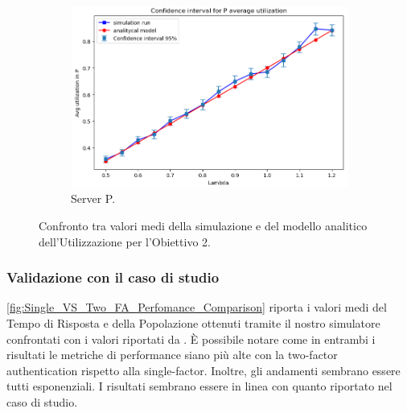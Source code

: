 \begin{figure}
\begin{subfigure}{0.5\linewidth}
        \includegraphics[width=1\linewidth]{figs//results//obj2//verification/obj2_lineplots_utilization_P.png}
        \caption{Server P.}
        \label{fig:obj2_lineplots_utilization_P}
    \end{subfigure}
    \caption{Confronto tra valori medi della simulazione e del modello analitico dell'Utilizzazione per l'Obiettivo 2.}
    \label{fig:obj2_lineplots_utilization}
\end{figure}

% 


\subsubsection{Validazione con il caso di studio}
\label{sec:results_obj2_validation}
\autoref{fig:Single_VS_Two_FA_Perfomance_Comparison} riporta i valori medi del Tempo di Risposta e della Popolazione ottenuti tramite il nostro simulatore confrontati con i valori riportati da \citet{DBLP:books/sp/Serazzi24}. È possibile notare come in entrambi i risultati le metriche di performance siano più alte con la two-factor authentication rispetto alla single-factor. Inoltre, gli andamenti sembrano essere tutti esponenziali. I risultati sembrano essere in linea con quanto riportato nel caso di studio.

